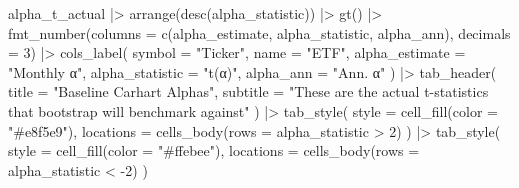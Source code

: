 \documentclass[
  letterpaper,
  DIV=11,
  numbers=noendperiod]{scrartcl}
\newenvironment{Shaded}{\begin{snugshade}}{\end{snugshade}}
\newcommand{\AttributeTok}[1]{\textcolor[rgb]{0.40,0.45,0.13}{#1}}
\newcommand{\DecValTok}[1]{\textcolor[rgb]{0.68,0.00,0.00}{#1}}
\newcommand{\FunctionTok}[1]{\textcolor[rgb]{0.28,0.35,0.67}{#1}}
\newcommand{\NormalTok}[1]{\textcolor[rgb]{0.00,0.23,0.31}{#1}}
\newcommand{\SpecialCharTok}[1]{\textcolor[rgb]{0.37,0.37,0.37}{#1}}
\newcommand{\StringTok}[1]{\textcolor[rgb]{0.13,0.47,0.30}{#1}}
\begin{document}
\begin{Shaded}
\begin{Highlighting}[]
\NormalTok{alpha\_t\_actual }\SpecialCharTok{|\textgreater{}}
  \FunctionTok{arrange}\NormalTok{(}\FunctionTok{desc}\NormalTok{(alpha\_statistic)) }\SpecialCharTok{|\textgreater{}}
  \FunctionTok{gt}\NormalTok{() }\SpecialCharTok{|\textgreater{}}
  \FunctionTok{fmt\_number}\NormalTok{(}\AttributeTok{columns =} \FunctionTok{c}\NormalTok{(alpha\_estimate, alpha\_statistic, alpha\_ann), }\AttributeTok{decimals =} \DecValTok{3}\NormalTok{) }\SpecialCharTok{|\textgreater{}}
  \FunctionTok{cols\_label}\NormalTok{(}
    \AttributeTok{symbol          =} \StringTok{"Ticker"}\NormalTok{,}
    \AttributeTok{name            =} \StringTok{"ETF"}\NormalTok{,}
    \AttributeTok{alpha\_estimate  =} \StringTok{"Monthly α"}\NormalTok{,}
    \AttributeTok{alpha\_statistic =} \StringTok{"t(α)"}\NormalTok{,}
    \AttributeTok{alpha\_ann       =} \StringTok{"Ann. α"}
\NormalTok{  ) }\SpecialCharTok{|\textgreater{}}
  \FunctionTok{tab\_header}\NormalTok{(}
    \AttributeTok{title    =} \StringTok{"Baseline Carhart Alphas"}\NormalTok{,}
    \AttributeTok{subtitle =} \StringTok{"These are the \textquotesingle{}actual\textquotesingle{} t{-}statistics that bootstrap will benchmark against"}
\NormalTok{  ) }\SpecialCharTok{|\textgreater{}}
  \FunctionTok{tab\_style}\NormalTok{(}
    \AttributeTok{style     =} \FunctionTok{cell\_fill}\NormalTok{(}\AttributeTok{color =} \StringTok{"\#e8f5e9"}\NormalTok{),}
    \AttributeTok{locations =} \FunctionTok{cells\_body}\NormalTok{(}\AttributeTok{rows =}\NormalTok{ alpha\_statistic }\SpecialCharTok{\textgreater{}} \DecValTok{2}\NormalTok{)}
\NormalTok{  ) }\SpecialCharTok{|\textgreater{}}
  \FunctionTok{tab\_style}\NormalTok{(}
    \AttributeTok{style     =} \FunctionTok{cell\_fill}\NormalTok{(}\AttributeTok{color =} \StringTok{"\#ffebee"}\NormalTok{),}
    \AttributeTok{locations =} \FunctionTok{cells\_body}\NormalTok{(}\AttributeTok{rows =}\NormalTok{ alpha\_statistic }\SpecialCharTok{\textless{}} \SpecialCharTok{{-}}\DecValTok{2}\NormalTok{)}
\NormalTok{  )}
\end{Highlighting}
\end{Shaded}
\end{document}
